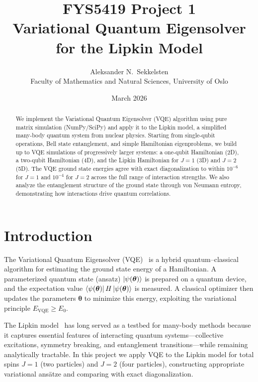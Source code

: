 \documentclass[11pt]{article}
\title{FYS5419 Project 1\\[0.3em] Variational Quantum Eigensolver for the Lipkin Model}
\author{Aleksander N.\ Sekkelsten\\
        \small Faculty of Mathematics and Natural Sciences, University of Oslo}
\date{March 2026}
\begin{document}
\maketitle

\begin{abstract}
We implement the Variational Quantum Eigensolver (VQE) algorithm using pure matrix simulation (NumPy/SciPy) and apply it to the Lipkin model, a simplified many-body quantum system from nuclear physics. Starting from single-qubit operations, Bell state entanglement, and simple Hamiltonian eigenproblems, we build up to VQE simulations of progressively larger systems: a one-qubit Hamiltonian (2D), a two-qubit Hamiltonian (4D), and the Lipkin Hamiltonian for $J=1$ (3D) and $J=2$ (5D). The VQE ground state energies agree with exact diagonalization to within $10^{-6}$ for $J=1$ and $10^{-4}$ for $J=2$ across the full range of interaction strengths. We also analyze the entanglement structure of the ground state through von Neumann entropy, demonstrating how interactions drive quantum correlations.
\end{abstract}

\section{Introduction}

The Variational Quantum Eigensolver (VQE)~\cite{Peruzzo2014} is a hybrid quantum--classical algorithm for estimating the ground state energy of a Hamiltonian. A parameterized quantum state (ansatz) $\ket{\psi(\boldsymbol\theta)}$ is prepared on a quantum device, and the expectation value $\bra{\psi(\boldsymbol\theta)} H \ket{\psi(\boldsymbol\theta)}$ is measured. A classical optimizer then updates the parameters $\boldsymbol\theta$ to minimize this energy, exploiting the variational principle $E_{\text{VQE}} \geq E_0$.

The Lipkin model~\cite{Lipkin1965} has long served as a testbed for many-body methods because it captures essential features of interacting quantum systems---collective excitations, symmetry breaking, and entanglement transitions---while remaining analytically tractable. In this project we apply VQE to the Lipkin model for total spins $J=1$ (two particles) and $J=2$ (four particles), constructing appropriate variational ans\"atze and comparing with exact diagonalization.
\end{document}
